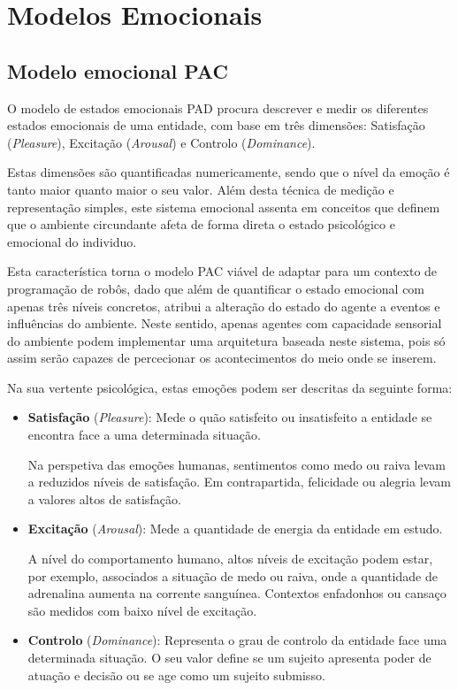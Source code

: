 \chapter{Modelos Emocionais}

\section{Modelo emocional PAC}

O modelo de estados emocionais PAD procura descrever e medir os diferentes estados emocionais de uma entidade, com base em três dimensões: Satisfação (\textit{Pleasure}), Excitação (\textit{Arousal}) e Controlo (\textit{Dominance}). 

Estas dimensões são quantificadas numericamente, sendo que o nível da emoção é tanto maior quanto maior o seu valor. 
Além desta técnica de medição e representação simples, este sistema emocional assenta em conceitos que definem que o ambiente circundante afeta de forma direta o estado psicológico e emocional do individuo. 

Esta característica torna o modelo PAC viável de adaptar para um contexto de programação de robôs, dado que além de quantificar o estado emocional com apenas três níveis concretos, atribui a alteração do estado do agente a eventos e influências do ambiente. 
Neste sentido, apenas agentes com capacidade sensorial do ambiente podem implementar uma arquitetura baseada neste sistema, pois só assim serão capazes de percecionar os acontecimentos do meio onde se inserem. 

Na sua vertente psicológica, estas emoções podem ser descritas da seguinte forma: 

\begin{itemize}
    \item \textbf{Satisfação} (\textit{Pleasure}): Mede o quão satisfeito ou insatisfeito a entidade se encontra face a uma determinada situação. 
    
    Na perspetiva das emoções humanas, sentimentos como medo ou raiva levam a reduzidos níveis de satisfação. Em contrapartida, felicidade ou alegria levam a valores altos de satisfação. 
    
    \item \textbf{Excitação} (\textit{Arousal}): Mede a quantidade de energia da entidade em estudo. 
    
    A nível do comportamento humano, altos níveis de excitação podem estar, por exemplo, associados a situação de medo ou raiva, onde a quantidade de adrenalina aumenta na corrente sanguínea. Contextos enfadonhos ou cansaço são medidos com baixo nível de excitação. 
    
    \item \textbf{Controlo} (\textit{Dominance}): Representa o grau de controlo da entidade face uma determinada situação. O seu valor define se um sujeito apresenta  poder de atuação e decisão ou se age como um sujeito submisso. 
\end{itemize}

